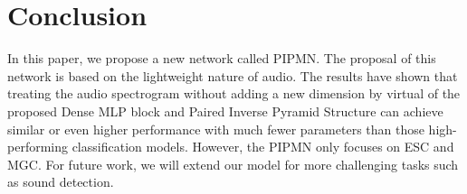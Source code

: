\documentclass[runningheads]{llncs}
\begin{document}
\section{Conclusion}
\label{sec:typestyle}

In this paper, we propose a new network called PIPMN. The proposal of this network is based on the lightweight nature of audio. The results have shown that treating the audio spectrogram without adding a new dimension by virtual of the proposed Dense MLP block and Paired Inverse Pyramid Structure can achieve similar or even higher performance with much fewer parameters than those high-performing classification models. However, the PIPMN only focuses on ESC and MGC. For future work, we will extend our model for more challenging tasks such as sound detection.
\end{document}

